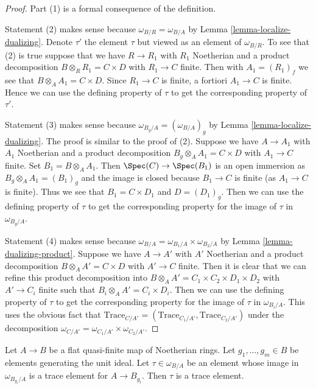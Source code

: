 \begin{proof}
Part (1) is a formal consequence of the definition.

\medskip\noindent
Statement (2) makes sense because $\omega_{B/R} = \omega_{B/A}$
by Lemma \ref{lemma-localize-dualizing}. Denote $\tau'$ the element
$\tau$ but viewed as an element of $\omega_{B/R}$. To see that (2) is true
suppose that we have $R \to R_1$ with $R_1$ Noetherian and a product
decomposition $B \otimes_R R_1 = C \times D$ with $R_1 \to C$ finite.
Then with $A_1 = (R_1)_f$ we see that $B \otimes_A A_1 = C \times D$.
Since $R_1 \to C$ is finite, a fortiori $A_1 \to C$ is finite.
Hence we can use the defining property of $\tau$ to get the corresponding
property of $\tau'$.

\medskip\noindent
Statement (3) makes sense because $\omega_{B_g/A} = (\omega_{B/A})_g$
by Lemma \ref{lemma-localize-dualizing}. The proof is similar to the proof
of (2). Suppose we have $A \to A_1$ with $A_1$ Noetherian and
a product decomposition $B_g \otimes_A A_1 = C \times D$ with $A_1 \to C$
finite. Set $B_1 = B \otimes_A A_1$. Then
$\Spec(C) \to \Spec(B_1)$ is an open immersion as $B_g \otimes_A A_1 = (B_1)_g$
and the image is closed because $B_1 \to C$ is finite
(as $A_1 \to C$ is finite).
Thus we see that $B_1 = C \times D_1$ and $D = (D_1)_g$. Then we can use
the defining property of $\tau$ to get the corresponding property
for the image of $\tau$ in $\omega_{B_g/A}$.

\medskip\noindent
Statement (4) makes sense because
$\omega_{B/A} = \omega_{B_1/A} \times \omega_{B_2/A}$ by
Lemma \ref{lemma-dualizing-product}.
Suppose we have $A \to A'$ with $A'$ Noetherian and
a product decomposition $B \otimes_A A' = C \times D$ with $A' \to C$
finite. Then it is clear that we can refine this product
decomposition into  $B \otimes_A A' = C_1 \times C_2 \times D_1 \times D_2$
with $A' \to C_i$ finite such that $B_i \otimes_A A' = C_i \times D_i$.
Then we can use the defining property of $\tau$ to get the corresponding
property for the image of $\tau$ in $\omega_{B_i/A}$. This uses the obvious
fact that
$\text{Trace}_{C/A'} = (\text{Trace}_{C_1/A'}, \text{Trace}_{C_2/A'})$
under the decomposition
$\omega_{C/A'} = \omega_{C_1/A'} \times \omega_{C_2/A'}$.
\end{proof}

\begin{lemma}
\label{lemma-glue-trace}
Let $A \to B$ be a flat quasi-finite map of Noetherian rings.
Let $g_1, \ldots, g_m \in B$ be elements generating the unit ideal.
Let $\tau \in \omega_{B/A}$ be an element whose image in
$\omega_{B_{g_i}/A}$ is a trace element for $A \to B_{g_i}$.
Then $\tau$ is a trace element.
\end{lemma}

